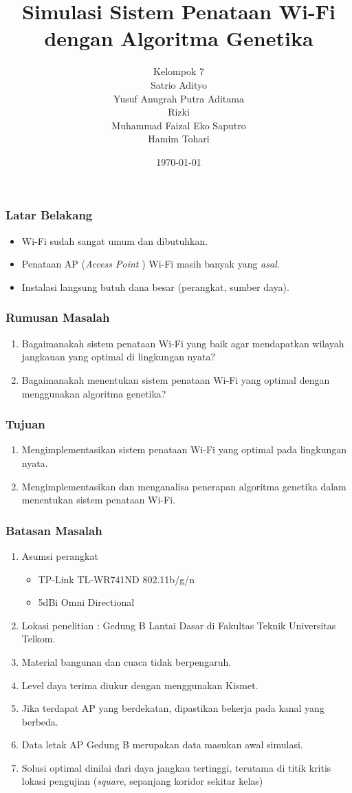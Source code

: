 \documentclass[12pt]{beamer}
\author{Kelompok 7\\Satrio Adityo\\Yusuf Anugrah Putra Aditama\\Rizki\\Muhammad Faizal Eko Saputro\\Hamim Tohari}
\title{Simulasi Sistem Penataan Wi-Fi dengan Algoritma Genetika}
\institute{Sarjana Teknik Informatika Universitas Telkom}
\date{\today}
\begin{document}
	\maketitle
	
	\begin{frame}
		\frametitle{Latar Belakang}
		\begin{itemize}
			\item Wi-Fi sudah sangat umum dan dibutuhkan.
			\item Penataan AP (\emph{Access Point }) Wi-Fi masih banyak yang \emph{asal}.
			\item Instalasi langsung butuh dana besar (perangkat, sumber daya).
		\end{itemize}
	\end{frame}
	
	\begin{frame}
		\frametitle{Rumusan Masalah}
		\begin{enumerate}
			\item Bagaimanakah sistem penataan Wi-Fi yang baik agar mendapatkan wilayah jangkauan yang optimal di lingkungan nyata?
			\item Bagaimanakah menentukan sistem penataan Wi-Fi yang optimal dengan menggunakan algoritma genetika?
		\end{enumerate}
	\end{frame}
	
	\begin{frame}
		\frametitle{Tujuan}
		\begin{enumerate}
			\item Mengimplementasikan sistem penataan Wi-Fi yang optimal pada lingkungan nyata.
			\item Mengimplementasikan dan menganalisa penerapan algoritma genetika dalam menentukan sistem penataan Wi-Fi.
		\end{enumerate}
	\end{frame}
	
	\begin{frame}
		\frametitle{Batasan Masalah}
		\begin{enumerate}
			\item Asumsi perangkat
			\begin{itemize}
				\item TP-Link TL-WR741ND 802.11b/g/n
				\item 5dBi Omni Directional
			\end{itemize}
			\item Lokasi penelitian : Gedung B Lantai Dasar di Fakultas Teknik Universitas Telkom.
			\item Material bangunan dan cuaca tidak berpengaruh.
			\item Level daya terima diukur dengan menggunakan Kismet.
			\item Jika terdapat AP yang berdekatan, dipastikan bekerja pada kanal yang berbeda.
			\item Data letak AP Gedung B merupakan data masukan awal simulasi.
			\item Solusi optimal dinilai dari daya jangkau tertinggi, terutama di titik kritis lokasi pengujian (\emph{square}, sepanjang koridor sekitar kelas)
		\end{enumerate}
	\end{frame}
	
\end{document}
